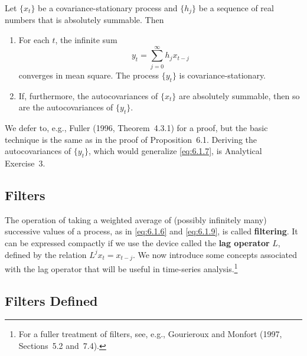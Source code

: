 \begin{proposition}
\label{prop:6.2}
Let $\{x_t\}$ be a covariance-stationary process and $\{h_j\}$ be a sequence of real numbers
that is absolutely summable. Then
\begin{enumerate}[label=(\alph*)]
\item For each $t$, the infinite sum
\begin{equation}
  y_t = \sum_{j=0}^{\infty} h_j x_{t-j}
  \label{eq:6.1.9}
\end{equation}
converges in mean square. The process $\{y_t\}$ is covariance-stationary.

\item If, furthermore, the autocovariances of $\{x_t\}$ are absolutely summable, then so
are the autocovariances of $\{y_t\}$.
\end{enumerate}
\end{proposition}

We defer to, e.g., Fuller (1996, Theorem~4.3.1) for a proof, but the basic technique
is the same as in the proof of Proposition~6.1. Deriving the autocovariances of $\{y_t\}$,
which would generalize \eqref{eq:6.1.7}, is Analytical Exercise~3.

\subsection*{Filters}

The operation of taking a weighted average of (possibly infinitely many) successive
values of a process, as in \eqref{eq:6.1.6} and \eqref{eq:6.1.9}, is called \textbf{filtering}. It can be expressed
compactly if we use the device called the \textbf{lag operator} $L$, defined by the relation
$L^j x_t = x_{t-j}$. We now introduce some concepts associated with the lag operator
that will be useful in time-series analysis.\footnote{For a fuller treatment of filters, see, e.g., Gourieroux and Monfort (1997, Sections~5.2 and~7.4).}

\subsection*{Filters Defined}

